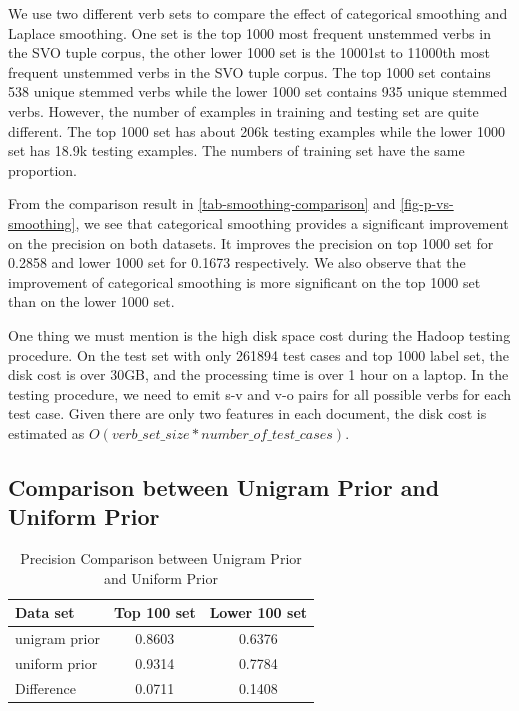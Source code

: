 We use two different verb sets to compare the effect of categorical smoothing and Laplace smoothing. One set is the top 1000 most frequent unstemmed verbs in the SVO tuple corpus, the other lower 1000 set is the 10001st to 11000th most frequent unstemmed verbs in the SVO tuple corpus. The top 1000 set contains 538 unique stemmed verbs while the lower 1000 set contains 935 unique stemmed verbs. However, the number of examples in training and testing set are quite different. The top 1000 set has about 206k testing examples while the lower 1000 set has 18.9k testing examples. The numbers of training set have the same proportion.

From the comparison result in \ref{tab-smoothing-comparison} and \ref{fig-p-vs-smoothing}, we see that categorical smoothing provides a significant improvement on the precision on both datasets. It improves the precision on top 1000 set for 0.2858 and lower 1000 set for 0.1673 respectively. We also observe that the improvement of categorical smoothing is more significant on the top 1000 set than on the lower 1000 set.

One thing we must mention is the high disk space cost during the Hadoop testing procedure. On the test set with only 261894 test cases and top 1000 label set, the disk cost is over 30GB, and the processing time is over 1 hour on a laptop. In the testing procedure, we need to emit s-v and v-o pairs for all possible verbs for each test case. Given there are only two features in each document, the disk cost is estimated as $O(verb\_set\_size * number\_of\_test\_cases)$. 

\subsection{Comparison between Unigram Prior and Uniform Prior}

\begin{table}[t]
\caption{Precision Comparison between Unigram Prior and Uniform Prior}
\label{tab-prior-comparison}
\vskip 0.15in
\begin{center}
\begin{small}
\begin{sc}
\begin{tabular}{l|cc}
\hline
\abovespace \belowspace
Data set & Top 100 set & Lower 100 set \\
\hline
\abovespace
unigram prior & 0.8603 & 0.6376 \\
\belowspace
uniform prior & 0.9314 & 0.7784 \\
\hline
\abovespace
\belowspace
Difference & 0.0711 & 0.1408 \\
\hline
\end{tabular}
\end{sc}
\end{small}
\end{center}
\vskip -0.1in
\end{table}

